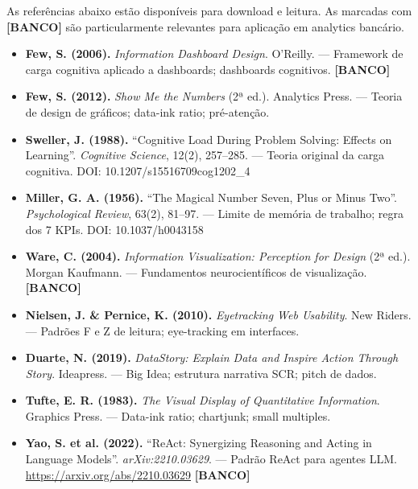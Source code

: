 As referências abaixo estão disponíveis para download e leitura. As marcadas com \textbf{[BANCO]} são particularmente relevantes para aplicação em analytics bancário.

\begin{itemize}
  \item \textbf{Few, S. (2006).} \textit{Information Dashboard Design}. O'Reilly. --- Framework de carga cognitiva aplicado a dashboards; dashboards cognitivos. \textbf{[BANCO]}

  \item \textbf{Few, S. (2012).} \textit{Show Me the Numbers} (2ª ed.). Analytics Press. --- Teoria de design de gráficos; data-ink ratio; pré-atenção.

  \item \textbf{Sweller, J. (1988).} ``Cognitive Load During Problem Solving: Effects on Learning''. \textit{Cognitive Science}, 12(2), 257--285. --- Teoria original da carga cognitiva. DOI: 10.1207/s15516709cog1202\_4

  \item \textbf{Miller, G. A. (1956).} ``The Magical Number Seven, Plus or Minus Two''. \textit{Psychological Review}, 63(2), 81--97. --- Limite de memória de trabalho; regra dos 7 KPIs. DOI: 10.1037/h0043158

  \item \textbf{Ware, C. (2004).} \textit{Information Visualization: Perception for Design} (2ª ed.). Morgan Kaufmann. --- Fundamentos neurocientíficos de visualização. \textbf{[BANCO]}

  \item \textbf{Nielsen, J. \& Pernice, K. (2010).} \textit{Eyetracking Web Usability}. New Riders. --- Padrões F e Z de leitura; eye-tracking em interfaces.

  \item \textbf{Duarte, N. (2019).} \textit{DataStory: Explain Data and Inspire Action Through Story}. Ideapress. --- Big Idea; estrutura narrativa SCR; pitch de dados.

  \item \textbf{Tufte, E. R. (1983).} \textit{The Visual Display of Quantitative Information}. Graphics Press. --- Data-ink ratio; chartjunk; small multiples.

  \item \textbf{Yao, S. et al. (2022).} ``ReAct: Synergizing Reasoning and Acting in Language Models''. \textit{arXiv:2210.03629}. --- Padrão ReAct para agentes LLM. \url{https://arxiv.org/abs/2210.03629} \textbf{[BANCO]}


\end{itemize}
